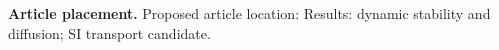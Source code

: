 \textbf{Article placement.} Proposed article location: Results: dynamic stability and diffusion; SI transport candidate.
